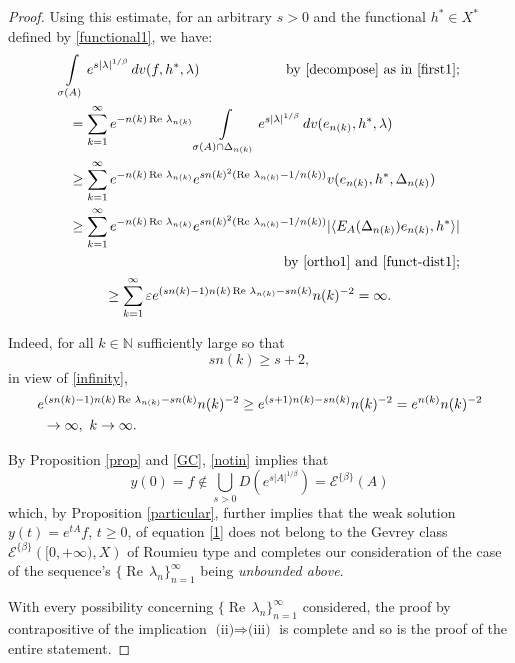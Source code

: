 \documentclass{amsart}
\theoremstyle{plain}
\theoremstyle{definition}
\begin{document}
\begin{proof}
Using this estimate, for an arbitrary $s>0$ and the functional $h^*\in X^*$ defined by \eqref{functional1}, we have:
\begin{multline}\label{notin}
\int\limits_{\sigma(A)}e^{s|\lambda|^{1/\beta}}\,dv(f,h^*,\lambda)
\hfill
\text{by \eqref{decompose} as in \eqref{first1};}
\\
\shoveleft{
=\sum_{k=1}^\infty e^{-n(k)\operatorname{Re\,}\lambda_{n(k)}}\int\limits_{\sigma(A)\cap\Delta_{n(k)}}e^{s|\lambda|^{1/\beta}}\,dv(e_{n(k)},h^*,\lambda)
}\\
\shoveleft{
\ge\sum_{k=1}^\infty e^{-n(k)\operatorname{Re\,}\lambda_{n(k)}}e^{sn(k)^2(\operatorname{Re\,}\lambda_{n(k)}-1/n(k))}v(e_{n(k)},h^*,\Delta_{n(k)})
}\\
\shoveleft{
\ge \sum_{k=1}^\infty e^{-n(k)\operatorname{Re\,}\lambda_{n(k)}}e^{sn(k)^2(\operatorname{Re\,}\lambda_{n(k)}-1/n(k))}|\langle E_A(\Delta_{n(k)})e_{n(k)},h^*\rangle|
}\\
\hfill
\text{by \eqref{ortho1} and \eqref{funct-dist1};}
\\
\hspace{1.2cm}
\ge \sum_{k=1}^\infty \varepsilon
e^{(sn(k)-1)n(k)\operatorname{Re\,}\lambda_{n(k)}-sn(k)}n(k)^{-2}
=\infty.
\hfill
\end{multline} 

Indeed, for all $k\in{{\mathbb N}}$ sufficiently large so that 
\begin{equation*}
sn(k)\ge s+2,
\end{equation*}
in view of \eqref{infinity},
\begin{multline*}
e^{(sn(k)-1)n(k)\operatorname{Re\,}\lambda_{n(k)}-sn(k)}n(k)^{-2}
\ge 
e^{(s+1)n(k)-sn(k)}n(k)^{-2}=e^{n(k)}n(k)^{-2}
\\
\ \
\to\infty,\ k\to\infty.
\hfill
\end{multline*}

By Proposition \ref{prop} and \eqref{GC},
\eqref{notin} implies that
\[
y(0)=f\notin \bigcup_{s>0} D(e^{s|A|^{1/\beta}})
={\mathscr E}^{\{\beta\}}(A)
\]
which, by Proposition \ref{particular}, further implies that the weak solution $y(t)=e^{tA}f$, $t\ge 0$, 
of equation \eqref{1} does not belong to the 
Gevrey class ${\mathscr E}^{\{\beta \}}\left( [0,+\infty),X\right)$ of Roumieu
type and completes our consideration of the case of
the sequence's $\{\operatorname{Re\,}\lambda_n\}_{n=1}^\infty$ being \textit{unbounded above}. 

With every possibility concerning $\{\operatorname{Re\,}\lambda_n\}_{n=1}^\infty$ considered, 
the proof by contrapositive of the implication 
$\text{(ii)}\Rightarrow \text{(iii)}$ is complete and so is the proof of the 
entire statement.
\end{proof}
\end{document}
